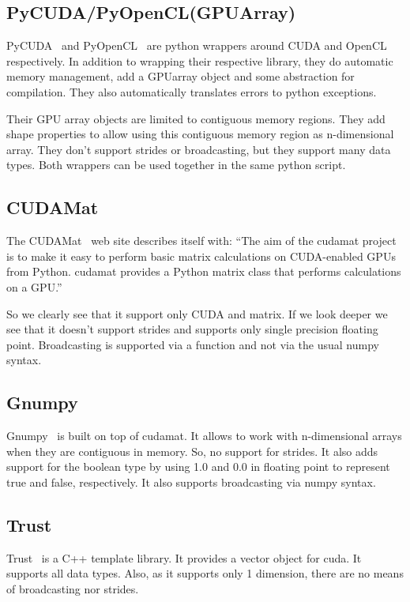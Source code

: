 \documentclass{article} %
\begin{document}
\subsection{PyCUDA/PyOpenCL(GPUArray)}
PyCUDA~\citep{kloeckner_pycuda_2009} and PyOpenCL~\citep{kloeckner_pycuda_2009} are python wrappers around CUDA and OpenCL respectively. In addition to wrapping their respective library, they do automatic memory management, add a GPUarray object and some abstraction for compilation. They also automatically translates errors to python exceptions.

Their GPU array objects are limited to contiguous memory regions. They add shape properties to allow using this contiguous memory region as n-dimensional array. They don't support strides or broadcasting, but they support many data types. Both wrappers can be used together in the same python script.

\subsection{CUDAMat}
The CUDAMat~\citep{cudamat-TR2009} web site describes itself with: ``The aim of the cudamat project is to make it easy to perform basic matrix calculations on CUDA-enabled GPUs from Python. cudamat provides a Python matrix class that performs calculations on a GPU.''

So we clearly see that it support only CUDA and matrix. If we look deeper we see that it doesn't support strides and supports only single precision floating point. Broadcasting is supported via a function and not via the usual numpy syntax.

\subsection{Gnumpy}
Gnumpy~\citep{gnumpy-TR2010} is built on top of cudamat. It allows to work with n-dimensional arrays when they are contiguous in memory. So, no support for strides. It also adds support for the boolean type by using 1.0 and 0.0 in floating point to represent true and false, respectively. It also supports broadcasting via numpy syntax.

\subsection{Trust}
Trust~\citep{Thrust} is a C++ template library. It provides a vector object for cuda. It supports all data types.  Also, as it supports only 1 dimension, there are no means of broadcasting nor strides.
\end{document}

